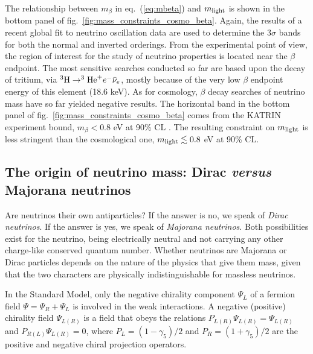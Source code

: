 The relationship between $m_{\beta}$ in eq.~(\ref{eq:mbeta}) and $m_{{\rm light}}$ is shown in the bottom panel of fig.~\ref{fig:mass_constraints_cosmo_beta}. Again, the results of a recent global fit to neutrino oscillation data \cite{Esteban:2020cvm} are used to determine the $3\sigma$ bands for both the normal and inverted orderings. From the experimental point of view, the region of interest for the study of neutrino properties is located near the $\beta$ endpoint. The most sensitive searches conducted so far are based upon the decay of tritium, via $^3{\rm H}\to^3{\rm He}^+e^-\bar{\nu}_e$, mostly because of the very low $\beta$ endpoint energy of this element (18.6 keV). As for cosmology, $\beta$ decay searches of neutrino mass have so far yielded negative results. The horizontal band in the bottom panel of fig.~\ref{fig:mass_constraints_cosmo_beta} comes from the KATRIN experiment bound, $m_{\beta}<0.8$ eV at 90\% CL \cite{KATRIN:2021uub}. The resulting constraint on $m_{{\rm light}}$ is less stringent than the cosmological one, $m_{{\rm light}}\lesssim 0.8$ eV at 90\% CL. 


\subsection{\label{subsec:massivenus_identity}The origin of neutrino mass: Dirac \emph{versus} Majorana neutrinos}

Are neutrinos their own antiparticles? If the answer is no, we speak of \emph{Dirac neutrinos}. If the answer is yes, we speak of \emph{Majorana neutrinos}. Both possibilities exist for the neutrino, being electrically neutral and not carrying any other charge-like conserved quantum number. Whether neutrinos are Majorana or Dirac particles depends on the nature of the physics that give them mass, given that the two characters are physically indistinguishable for massless neutrinos.

In the Standard Model, only the negative chirality component $\Psi_L$ of a fermion field $\Psi=\Psi_R+\Psi_L$ is involved in the weak interactions. A negative (positive) chirality field $\Psi_{L(R)}$ is a field that obeys the relations $P_{L(R)}\Psi_{L(R)}=\Psi_{L(R)}$ and $P_{R(L)}\Psi_{L(R)}=0$, where $P_L=(1-\gamma_5)/2$ and $P_R=(1+\gamma_5)/2$ are the positive and negative chiral projection operators. 

